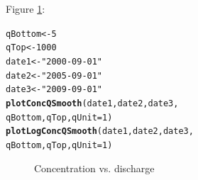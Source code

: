 \documentclass[a4paper,11pt]{article}\usepackage{graphicx, color}
\makeatletter
\newcommand{\hlfunctioncall}[1]{\textcolor[rgb]{0.501960784313725,0,0.329411764705882}{\textbf{#1}}}%
\newcommand{\hlstring}[1]{\textcolor[rgb]{0.6,0.6,1}{#1}}%
\newenvironment{kframe}{%
 \def\at@end@of@kframe{}%
 \ifinner\ifhmode%
  \def\at@end@of@kframe{\end{minipage}}%
  \begin{minipage}{\columnwidth}%
 \fi\fi%
 \def\FrameCommand##1{\hskip\@totalleftmargin \hskip-\fboxsep
 \colorbox{shadecolor}{##1}\hskip-\fboxsep
     \hskip-\linewidth \hskip-\@totalleftmargin \hskip\columnwidth}%
 \MakeFramed {\advance\hsize-\width
   \@totalleftmargin\z@ \linewidth\hsize
   \@setminipage}}%
 {\par\unskip\endMakeFramed%
 \at@end@of@kframe}
\newenvironment{knitrout}{}{} %
\makeatother
\begin{document}
Figure \ref{fig:plotLogConcQSmooth}:
\begin{knitrout}
\color{fgcolor}\begin{kframe}
\begin{alltt}
qBottom<-5
qTop<-1000
date1 <- \hlstring{"2000-09-01"}
date2 <- \hlstring{"2005-09-01"}
date3 <- \hlstring{"2009-09-01"}
\hlfunctioncall{plotConcQSmooth}(date1, date2, date3,
                qBottom, qTop, qUnit=1)
\hlfunctioncall{plotLogConcQSmooth}(date1, date2, date3,
                   qBottom, qTop, qUnit=1)
\end{alltt}
\end{kframe}\begin{figure}[]
\caption[Concentration vs]{Concentration vs. discharge\label{fig:plotLogConcQSmooth}}
\end{figure}


\end{knitrout}
\end{document}
